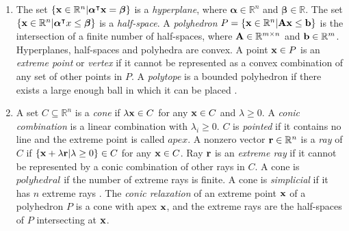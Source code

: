 \begin{enumerate}
    \item The set $\{\bold x \in \mathbb{R}^n | \boldsymbol \alpha^\intercal \bold x = \boldsymbol \beta \}$ is a \textit{hyperplane}, where $\boldsymbol \alpha \in \mathbb{R}^n$ and $\boldsymbol \beta \in \mathbb{R}$. The set $\{\bold x \in \mathbb{R}^n | \boldsymbol \alpha^\intercal x \leq \boldsymbol \beta \}$ is a \textit{half-space}. %
    A \textit{polyhedron} $P = \{ \bold x \in \mathbb{R}^n | \bold A \bold x \leq \bold b\}$ is the intersection of a finite number of half-spaces, where $\bold A \in \mathbb{R}^{m \times n}$ and $\bold b \in \mathbb{R}^m$. Hyperplanes, half-spaces and polyhedra are convex. A point $\bold x \in P$ is an \textit{extreme point} or \textit{vertex} if it cannot be represented as a convex combination of any set of other points in $P$. %
    A \textit{polytope} is a bounded polyhedron if there exists a large enough ball in which it can be placed \cite{understanding_lp}.

    \item A set $C \subseteq \mathbb{R}^n$ is a \textit{cone} if $\lambda \bold x \in C$ for any $\bold x \in C$ and $\lambda \geq 0$. A \textit{conic combination} is a linear combination with $\lambda_i \geq 0$. %
    $C$ is \textit{pointed} if it contains no line and the extreme point is called $apex$. A nonzero vector $\bold r \in \mathbb{R}^n$ is a \textit{ray} of $C$ if $\{\bold x + \lambda \bold r | \lambda \geq 0 \} \in C$ for any $\bold x \in C$. Ray $\bold r$ is an \textit{extreme ray} if it cannot be represented by a conic combination of other rays in $C$. 
    A cone is $polyhedral$ if the number of extreme rays is finite. A cone is \textit{simplicial} if it has $n$ extreme rays \cite{bienstock_outer_product_free_sets}. 
    The \textit{conic relaxation} of an extreme point $\bold x$ of a polyhedron $P$ is a cone with apex $\bold x$, and the extreme rays are the half-spaces of $P$ intersecting at $\bold x$.
    

\end{enumerate}
